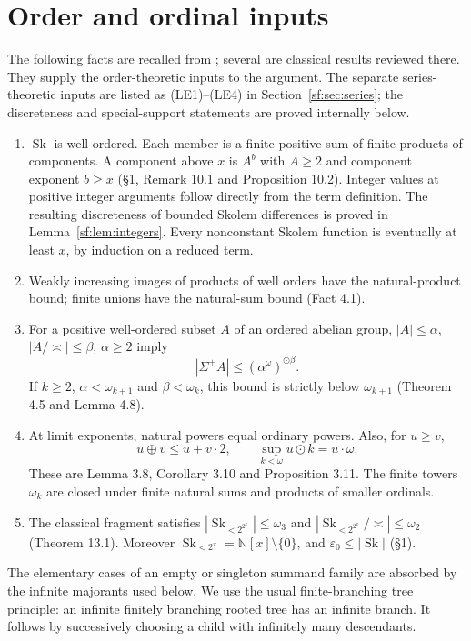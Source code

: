 \documentclass[11pt]{article}
\theoremstyle{definition}
\theoremstyle{remark}
\newcommand{\Sk}{\operatorname{Sk}}
\newcommand{\N}{\mathbb N}
\newcommand{\arch}{\mathrel{\asymp}}
\newcommand{\hs}{\mathbin{\oplus}}
\newcommand{\od}{\mathbin{\odot}}
\numberwithin{equation}{section}
\begin{document}
\section{Order and ordinal inputs}
The following facts are recalled from \cite{BM}; several are classical
results reviewed there. They supply the order-theoretic inputs to the
argument. The separate series-theoretic inputs are listed as
(LE1)--(LE4) in Section~\ref{sf:sec:series}; the discreteness and
special-support statements are proved internally below.
\begin{enumerate}[label=\textup{(BM\arabic*)},leftmargin=4em]
\item $\Sk$ is well ordered. Each member is a finite positive
sum of finite products of components. A component above $x$ is
$A^b$ with $A\ge2$ and component exponent $b\ge x$
(\S1, Remark 10.1 and Proposition 10.2).
Integer values at positive integer arguments follow directly
from the term definition. The resulting discreteness of bounded
Skolem differences is proved in Lemma~\ref{sf:lem:integers}.
Every nonconstant Skolem function is eventually at least $x$,
by induction on a reduced term.
\item Weakly increasing images of products of well orders have
the natural-product bound; finite unions have the natural-sum
bound (Fact 4.1).
\item For a positive well-ordered subset $A$ of an ordered abelian
group, $|A|\le\alpha$, $|A/\arch|\le\beta$, $\alpha\ge2$ imply
\begin{equation}
 |\Sigma^+A|\le(\alpha^\omega)^{\od\beta}.
 \label{ext-sums}
\end{equation}
If $k\ge2$, $\alpha<\omega_{k+1}$ and $\beta<\omega_k$,
this bound is strictly below $\omega_{k+1}$
(Theorem 4.5 and Lemma 4.8).
\item At limit exponents, natural powers equal ordinary powers.
Also, for $u\ge v$,
\begin{equation}
 u\hs v\le u+v\cdot2,\qquad
 \sup_{k<\omega}u\od k=u\cdot\omega.
 \label{ext-ordinals}
\end{equation}
These are Lemma 3.8, Corollary 3.10 and Proposition 3.11.
The finite towers $\omega_k$ are closed under finite natural
sums and products of smaller ordinals.
\item The classical fragment satisfies
$|\Sk_{<2^{2^x}}|\le\omega_3$ and
$|\Sk_{<2^{2^x}}/\arch|\le\omega_2$
(Theorem 13.1). Moreover $\Sk_{<2^x}=\N[x]\setminus\{0\}$,
and $\varepsilon_0\le|\Sk|$ (\S1).
\end{enumerate}
The elementary cases of an empty or singleton summand family
are absorbed by the infinite majorants used below. We use the
usual finite-branching tree principle: an infinite finitely
branching rooted tree has an infinite branch. It follows by
successively choosing a child with infinitely many descendants.
\end{document}
